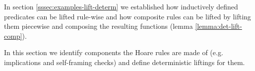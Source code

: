 In section \ref{sssec:examples-lift-determ} we established how inductively defined predicates can be lifted rule-wise and how composite rules can be lifted by lifting them piecewise and composing the resulting functions (lemma \ref{lemma:det-lift-comp}).

In this section we identify components the Hoare rules are made of (e.g. implications and self-framing checks) and define deterministic liftings for them.
